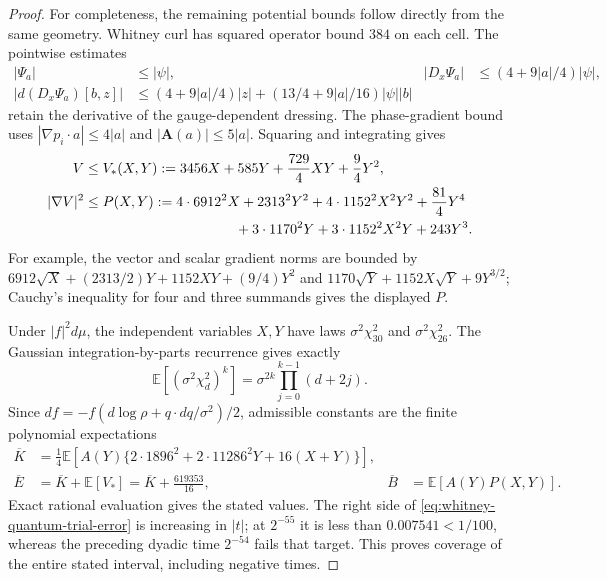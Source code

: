 \begin{proof}
For completeness, the remaining potential bounds follow directly from
the same geometry. Whitney curl has squared operator bound \(384\)
on each cell. The pointwise estimates
\begin{align*}
 |\Psi_a|&\leq|\psi|,&
 |D_x\Psi_a|&\leq(4+9|a|/4)|\psi|,\\
 |d(D_x\Psi_a)[b,z]|&\leq(4+9|a|/4)|z|
                   +(13/4+9|a|/16)|\psi||b|
\end{align*}
retain the derivative of the gauge-dependent dressing. The phase-gradient
bound uses \(|\nabla p_i\cdot a|\leq4|a|\) and
\(|\mathbf A(a)|\leq5|a|\). Squaring and integrating gives
\begin{align*}
 V&\leq V_*(X,Y):=3456X+585Y+\frac{729}{4}XY+\frac94Y^2,\\
 |\nabla V|^2&\leq P(X,Y):=
 4\cdot6912^2X+2313^2Y^2+4\cdot1152^2X^2Y^2+\frac{81}{4}Y^4\\
 &\hspace{38mm}+3\cdot1170^2Y+3\cdot1152^2X^2Y+243Y^3.
\end{align*}
For example, the vector and scalar gradient norms are bounded by
\(6912\sqrt X+(2313/2)Y+1152XY+(9/4)Y^2\) and
\(1170\sqrt Y+1152X\sqrt Y+9Y^{3/2}\); Cauchy's inequality for
four and three summands gives the displayed \(P\).

Under \(|f|^2d\mu\), the independent variables \(X,Y\) have laws
\(\sigma^2\chi^2_{30}\) and \(\sigma^2\chi^2_{26}\). The Gaussian
integration-by-parts recurrence gives exactly
\[
 \mathbb E[(\sigma^2\chi^2_d)^k]
       =\sigma^{2k}\prod_{j=0}^{k-1}(d+2j).
\]
Since \(df=-f(d\log\rho+q\cdot dq/\sigma^2)/2\), admissible
constants are the finite polynomial expectations
\begin{align*}
 \overline K&=\frac14\mathbb E\!\left[
 A(Y)\{2\cdot1896^2+2\cdot11286^2Y+16(X+Y)\}\right],\\
 \overline E&=\overline K+\mathbb E[V_*]
             =\overline K+\frac{619353}{16},&
 \overline B&=\mathbb E[A(Y)P(X,Y)].
\end{align*}
Exact rational evaluation gives the stated values. The right side of
\eqref{eq:whitney-quantum-trial-error} is increasing in \(|t|\);
at \(2^{-55}\) it is less than \(0.007541<1/100\), whereas the
preceding dyadic time \(2^{-54}\) fails that target. This proves coverage
of the entire stated interval, including negative times.
\end{proof}

